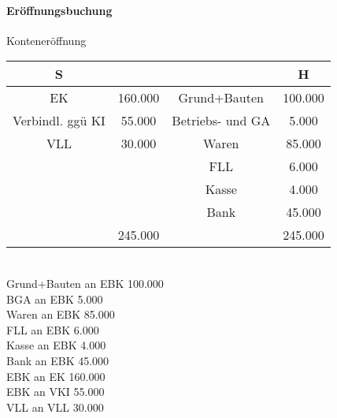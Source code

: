 \documentclass[paper=a4, fontsize=11pt]{scrartcl}
\numberwithin{equation}{section}
\numberwithin{figure}{section}
\numberwithin{table}{section}
\begin{document}
\paragraph{Eröffnungsbuchung}
Konteneröffnung \\
\begin{tabular}{cc|cc}
S & & & H \\\hline
EK & 160.000 & Grund+Bauten & 100.000 \\
Verbindl. ggü KI & 55.000 & Betriebs- und GA & 5.000 \\
VLL & 30.000 & Waren & 85.000 \\  
  & & FLL & 6.000 \\
  & & Kasse & 4.000 \\  
  & & Bank & 45.000 \\\hline
  & 245.000 & & 245.000 \\\hline
\end{tabular} \\

Grund+Bauten an EBK 100.000 \\
BGA an EBK 5.000 \\
Waren an EBK 85.000 \\
FLL an EBK 6.000 \\
Kasse an EBK 4.000 \\
Bank an EBK 45.000 \\
EBK an EK 160.000 \\
EBK an VKI 55.000 \\
VLL an VLL 30.000 \\
\end{document}
